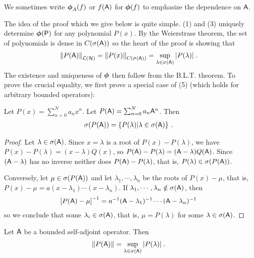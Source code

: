 We sometimes write $\boldsymbol{\phi}_A(f)$ or $f(\mathsf{A})$ for $\boldsymbol{\phi}(f)$ to emphasize the dependence on $\mathsf{A}$.

The idea of the proof which we give below is quite simple. (1) and (3) uniquely determine $\boldsymbol{\phi}(\mathsf{P})$ for any polynomial $P(x)$. By the Weierstrass theorem, the set of polynomials is dense in $C(\sigma( \mathsf{A}))$ so the heart of the proof is showing that
\begin{align}
    \left \Vert P(\mathsf{A}) \right \Vert_{\mathcal{L}(\mathcal{H})} = \left \Vert P(x) \right \Vert_{C(\sigma(\mathsf{A})) } = \sup_{\lambda \in \sigma(\mathsf{A})} |P(\lambda)| \:.
\end{align}
The existence and uniqueness of $\boldsymbol{\phi}$ then follow from the B.L.T. theorem.
To prove the crucial equality, we first prove a special case of (5) (which holds for arbitrary bounded operators):

\begin{lemma} \label{Lemma VII.1}
    Let $P(x) = \sum_{n=0}^N a_n x^n$. Let $P(\mathsf{A}) = \sum_{n=0}^N a_n \mathsf{A}^n$. Then \begin{align}
        \sigma(P(\mathsf{A})) = \left \lbrace P(\lambda) | \lambda \in \sigma(\mathsf{A}) \right \rbrace \:.
    \end{align}
\end{lemma}

\begin{proof}
    Let $\lambda \in \sigma(\mathsf{A})$. Since $x = \lambda$ is a root of $P(x) - P(\lambda)$, we have $P(x)- P(\lambda) = (x-\lambda) Q(x)$, so $P(\mathsf{A}) - P(\lambda) = (\mathsf{A} - \lambda) Q(\mathsf{A})$.
    Since $(\mathsf{A} - \lambda)$ has no inverse neither does $P(\mathsf{A}) - P(\lambda)$, that is, $P(\lambda) \in \sigma(P(\mathsf{A}))$.

    Conversely, let $\mu \in \sigma(P(\mathsf{A}))$ and let $\lambda_1, \cdots, \lambda_n$ be the roots of $P(x)- \mu$, that is, $P(x) - \mu = a (x-\lambda_1) \cdots (x- \lambda_n)$. If $\lambda_1, \cdots, \lambda_n \notin \sigma(\mathsf{A})$, then \begin{align}
        \left[ P(\mathsf{A}) - \mu \right]^{-1} = a^{-1} (\mathsf{A} - \lambda_1)^{-1} \cdots (\mathsf{A} - \lambda_n)^{-1}
    \end{align}
    so we conclude that some $\lambda_i \in \sigma(\mathsf{A})$, that is, $\mu = P(\lambda)$ for some $\lambda \in \sigma(\mathsf{A})$.
\end{proof}

\begin{lemma}
    Let $\mathsf{A}$ be a bounded self-adjoint operator. Then
    \begin{align}
        \left \Vert P(\mathsf{A}) \right \Vert = \sup_{\lambda \in \sigma (\mathsf{A})} |P(\lambda)| \:.
    \end{align}
\end{lemma}

